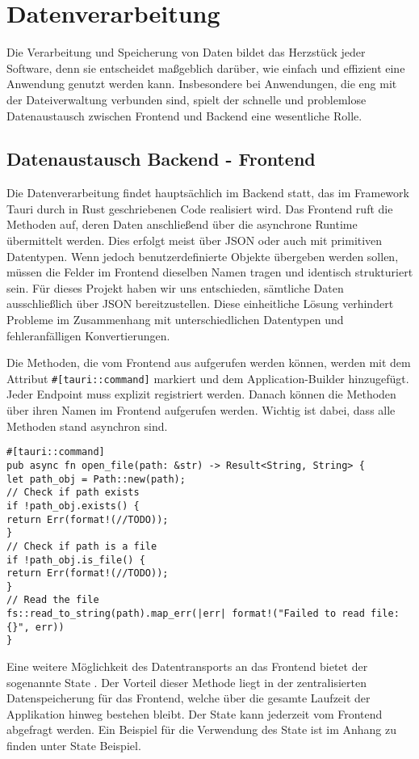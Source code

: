 \section{Datenverarbeitung}

Die Verarbeitung und Speicherung von Daten bildet das Herzstück jeder Software, denn sie entscheidet
maßgeblich darüber, wie einfach und effizient eine Anwendung genutzt werden kann. Insbesondere bei
Anwendungen, die eng mit der Dateiverwaltung verbunden sind, spielt der schnelle und problemlose
Datenaustausch zwischen Frontend und Backend eine wesentliche Rolle.


\subsection{Datenaustausch Backend - Frontend}
Die Datenverarbeitung findet hauptsächlich im Backend statt, das im Framework Tauri \cite{tauri2025} durch in Rust geschriebenen
Code realisiert wird. Das Frontend ruft die Methoden auf, deren Daten anschließend über die
asynchrone Runtime übermittelt werden. Dies erfolgt meist über JSON oder auch mit primitiven Datentypen. Wenn jedoch
benutzerdefinierte Objekte übergeben werden sollen, müssen die Felder im Frontend dieselben Namen tragen und identisch
strukturiert sein. Für dieses Projekt haben wir uns entschieden, sämtliche Daten ausschließlich über JSON bereitzustellen. Diese
einheitliche Lösung verhindert Probleme im Zusammenhang mit unterschiedlichen Datentypen und fehleranfälligen Konvertierungen.

Die Methoden, die vom Frontend aus aufgerufen werden können, werden mit dem Attribut \verb|#[tauri::command]| markiert und dem
Application-Builder hinzugefügt. Jeder Endpoint muss explizit registriert werden. Danach können die Methoden über ihren Namen im
Frontend aufgerufen werden. Wichtig ist dabei, dass alle Methoden stand asynchron sind.

{\small
\begin{verbatim}
#[tauri::command]
pub async fn open_file(path: &str) -> Result<String, String> {
let path_obj = Path::new(path);
// Check if path exists
if !path_obj.exists() {
return Err(format!(//TODO));
}
// Check if path is a file
if !path_obj.is_file() {
return Err(format!(//TODO));
}
// Read the file
fs::read_to_string(path).map_err(|err| format!("Failed to read file: {}", err))
}
\end{verbatim}
}

Eine weitere Möglichkeit des Datentransports an das Frontend bietet der sogenannte State
\cite{tauri_state_management}. Der Vorteil dieser Methode liegt in der zentralisierten Datenspeicherung für das Frontend, welche
über die gesamte Laufzeit der Applikation hinweg bestehen bleibt. Der State kann jederzeit vom Frontend abgefragt werden. Ein
Beispiel für die Verwendung des State ist im Anhang zu finden unter State Beispiel.


